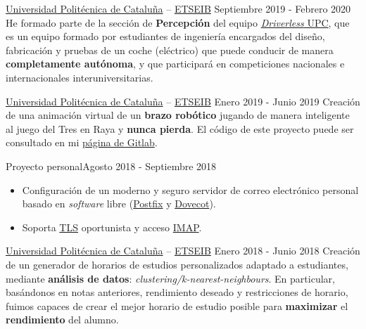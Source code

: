 \documentclass[10pt, a4paper, ragged2e]{../altacv}
\begin{document}
{\href{https://upc.edu}{Universidad Politécnica de Cataluña} --
\href{https://etseib.upc.edu}{ETSEIB}}
{Septiembre 2019 - Febrero 2020}{}
He formado parte de la sección de \textbf{Percepción} del equipo
\href{https://driverless.upc.edu}{\textit{Driverless} UPC}, que es un equipo
formado por estudiantes de ingeniería encargados del diseño, fabricación y
pruebas de un coche (eléctrico) que puede conducir de manera \textbf{completamente
autónoma}, y que participará en competiciones nacionales e internacionales
interuniversitarias.

\divider

{\href{https://upc.edu}{Universidad Politécnica de Cataluña} --
\href{https://etseib.upc.edu}{ETSEIB}}
{Enero 2019 - Junio 2019}{}
Creación de una animación virtual de un \textbf{brazo robótico} jugando de
manera inteligente al juego del Tres en Raya y \textbf{nunca pierda}. El código
de este proyecto puede ser consultado en mi
\href{https://gitlab.com/david-alvarez-rosa}{página de Gitlab\footnotemark}.

\divider

{Proyecto personal}{Agosto 2018 - Septiembre 2018}{}
\begin{itemize}
  \item Configuración de un moderno y seguro servidor de correo electrónico
  personal basado en \textit{software} libre
  (\href{http://www.postfix.org/}{Postfix} y
  \href{https://www.dovecot.org/}{Dovecot}).
  \item Soporta \href{https://es.wikipedia.org/wiki/Transport_Layer_Security}{TLS}
  oportunista y acceso
  \href{https://es.wikipedia.org/wiki/Protocolo_de_acceso_a_mensajes_de_Internet}
  {IMAP}.
\end{itemize}

\divider

{\href{https://upc.edu}{Universidad Politécnica de Cataluña} --
\href{https://etseib.upc.edu}{ETSEIB}}
{Enero 2018 - Junio 2018}{}
Creación de un generador de horarios de estudios personalizados adaptado a
estudiantes, mediante \textbf{análisis de
  datos}: \textit{clustering/k-nearest-neighbours}. En particular, basándonos en
notas anteriores, rendimiento deseado y restricciones de horario, fuimos capaces
de crear el mejor horario de estudio posible para \textbf{maximizar} el
\textbf{rendimiento} del alumno.


\medskip


\end{document}
